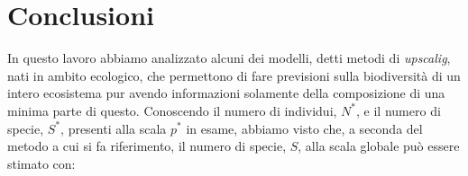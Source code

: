 \chapter{Conclusioni}




%
%
%
%

In questo lavoro abbiamo analizzato alcuni dei modelli, detti metodi di \emph{upscalig}, nati in ambito ecologico, che permettono di fare previsioni sulla biodiversità di un intero ecosistema pur avendo informazioni solamente della composizione  di una minima parte di questo. Conoscendo il numero di individui, $N^*$, e il numero di specie, $S^*$, presenti alla scala $p^*$ in esame, abbiamo visto che, a seconda del metodo a cui si fa riferimento, il numero di specie, $S$, alla scala globale può essere stimato con:

